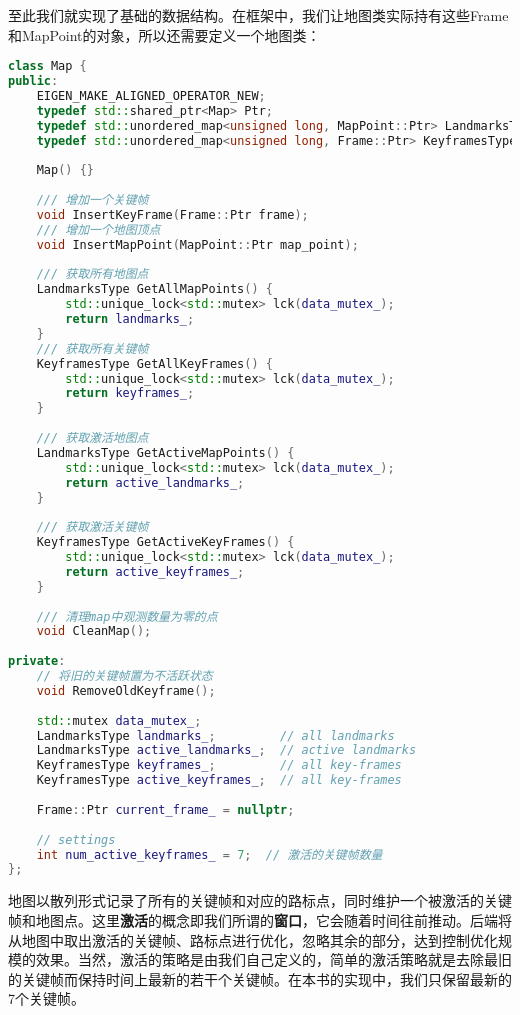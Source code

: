 至此我们就实现了基础的数据结构。在框架中，我们让地图类实际持有这些Frame和MapPoint的对象，所以还需要定义一个地图类：
\begin{lstlisting}[language=c++,caption=slambook2/ch13/include/myslam/map.h]
class Map {
public:
    EIGEN_MAKE_ALIGNED_OPERATOR_NEW;
    typedef std::shared_ptr<Map> Ptr;
    typedef std::unordered_map<unsigned long, MapPoint::Ptr> LandmarksType;
    typedef std::unordered_map<unsigned long, Frame::Ptr> KeyframesType;
    
    Map() {}
    
    /// 增加一个关键帧
    void InsertKeyFrame(Frame::Ptr frame);
    /// 增加一个地图顶点
    void InsertMapPoint(MapPoint::Ptr map_point);
    
    /// 获取所有地图点
    LandmarksType GetAllMapPoints() {
        std::unique_lock<std::mutex> lck(data_mutex_);
        return landmarks_;
    }
    /// 获取所有关键帧
    KeyframesType GetAllKeyFrames() {
        std::unique_lock<std::mutex> lck(data_mutex_);
        return keyframes_;
    }
    
    /// 获取激活地图点
    LandmarksType GetActiveMapPoints() {
        std::unique_lock<std::mutex> lck(data_mutex_);
        return active_landmarks_;
    }
    
    /// 获取激活关键帧
    KeyframesType GetActiveKeyFrames() {
        std::unique_lock<std::mutex> lck(data_mutex_);
        return active_keyframes_;
    }
    
    /// 清理map中观测数量为零的点
    void CleanMap();
    
private:
    // 将旧的关键帧置为不活跃状态
    void RemoveOldKeyframe();
    
    std::mutex data_mutex_;
    LandmarksType landmarks_;         // all landmarks
    LandmarksType active_landmarks_;  // active landmarks
    KeyframesType keyframes_;         // all key-frames
    KeyframesType active_keyframes_;  // all key-frames
    
    Frame::Ptr current_frame_ = nullptr;
    
    // settings
    int num_active_keyframes_ = 7;  // 激活的关键帧数量
};
\end{lstlisting}

地图以散列形式记录了所有的关键帧和对应的路标点，同时维护一个被激活的关键帧和地图点。这里\textbf{激活}的概念即我们所谓的\textbf{窗口}，它会随着时间往前推动。后端将从地图中取出激活的关键帧、路标点进行优化，忽略其余的部分，达到控制优化规模的效果。当然，激活的策略是由我们自己定义的，简单的激活策略就是去除最旧的关键帧而保持时间上最新的若干个关键帧。在本书的实现中，我们只保留最新的7个关键帧。

